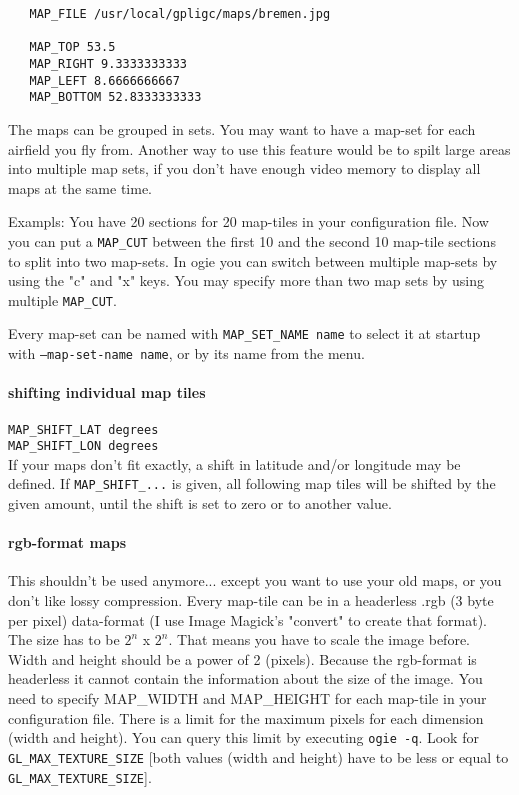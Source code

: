 \begin{verbatim}
   MAP_FILE /usr/local/gpligc/maps/bremen.jpg

   MAP_TOP 53.5
   MAP_RIGHT 9.3333333333
   MAP_LEFT 8.6666666667
   MAP_BOTTOM 52.8333333333
\end{verbatim}

The maps can be grouped in sets. You may want to have a map-set for each airfield you fly from.
Another way to use this feature would be to spilt large areas into multiple map sets, if you don't have enough video memory to display all maps at the same time.

Exampls: You have 20 sections for 20 map-tiles in your configuration file.
Now you can put a \texttt{MAP\_CUT} between the first 10 and the second 10
map-tile sections to split into two map-sets.
In ogie you can switch between multiple map-sets by using the "c" and "x" keys.
You may specify more than two map sets by using multiple \texttt{MAP\_CUT}.

Every map-set can be named with \texttt{MAP\_SET\_NAME name} to select it at startup with \texttt{--map-set-name name}, or by its name from the menu.


\paragraph{shifting individual map tiles}
$\,$ \\
\texttt{MAP\_SHIFT\_LAT  degrees} \\
\texttt{MAP\_SHIFT\_LON  degrees} \\
If your maps don't fit exactly, a shift in latitude and/or longitude may be defined.
If  \texttt{MAP\_SHIFT\_...} is given, all following map tiles will be shifted by the given amount, until the shift
is set to zero or to another value.


\paragraph{rgb-format maps}
This shouldn't be used anymore... except you want to use your old maps,
or you don't like lossy compression.
Every map-tile can be in a headerless .rgb (3 byte per pixel) data-format (I
use Image Magick's "convert" to create that format). The size has to
be $2^n$ x $2^n$. That means   you have to scale the image before. Width and height
should be a power of 2 (pixels).
Because the rgb-format is headerless it cannot contain the information about the size
of the image. You need to specify MAP\_WIDTH and MAP\_HEIGHT for each map-tile in your
configuration file.
There is a limit for the maximum pixels for each dimension (width and height).
You can query this limit by executing \texttt{ogie -q}.
Look for \texttt{GL\_MAX\_TEXTURE\_SIZE} [both values (width and height) have to be less or equal
to \texttt{GL\_MAX\_TEXTURE\_SIZE}].


